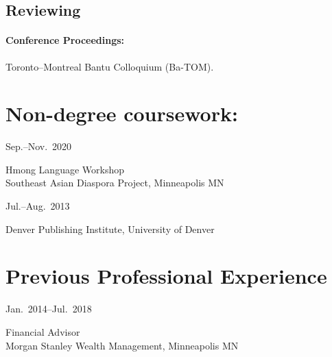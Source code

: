 \documentclass[11pt,oneside,DIV=9,parskip=off]{scrarticle} %
\newlength{\leftcolwidth}
\newlength{\rightcolwidth}
\newlength{\spacingbefore}
\newlength{\spacingafter}
\newcommand{\mytwocol}[2]{%
	\vspace{\spacingbefore}%
	\begin{minipage}[t]{\leftcolwidth}%
		\strut#1%
	\end{minipage}%
	\begin{minipage}[t]{\rightcolwidth}%
		\strut#2%
	\end{minipage}%
	\vspace{\spacingafter}\par%
	}
\newcommand{\cvline}[2]{%
	\mytwocol{#1}{#2}%
	}
\begin{document}
\subsection{Reviewing}

\paragraph{Conference Proceedings:} Toronto–Montreal Bantu Colloquium (Ba-TOM).

\section{Non-degree coursework:}
\cvline{Sep.--Nov.\ 2020}{Hmong Language Workshop\\Southeast Asian Diaspora Project, Minneapolis MN}
\cvline{Jul.--Aug.\ 2013}{Denver Publishing Institute, University of Denver}

\section{Previous Professional Experience}
\cvline{Jan.\ 2014--Jul.\ 2018}{Financial Advisor\\Morgan Stanley Wealth Management, Minneapolis MN}

\end{document}
